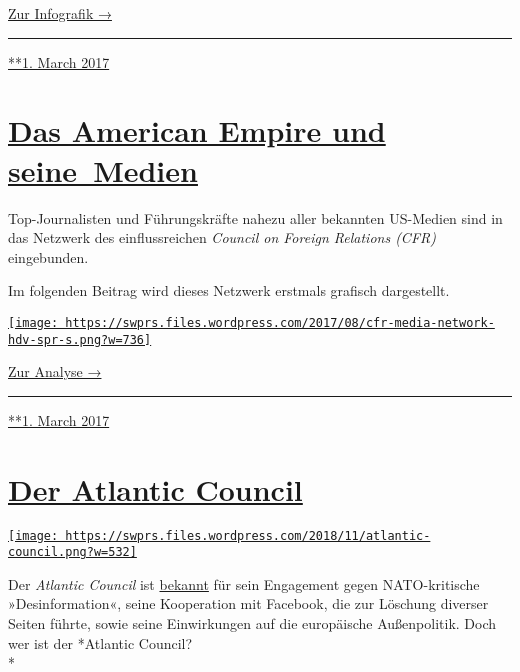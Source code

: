 \href{https://swprs.org/netzwerk-medien-schweiz}{Zur Infografik →}

\begin{center}\rule{0.5\linewidth}{\linethickness}\end{center}

\href{https://swprs.org/2017/03/01/das-netzwerk/}{**1. March 2017}

\hypertarget{das-american-empire-und-seine-medien}{%
\section{\texorpdfstring{\href{https://swprs.org/2017/03/01/netzwerk-medien-usa/}{Das
American Empire und
seine~Medien}}{Das American Empire und seine~Medien}}\label{das-american-empire-und-seine-medien}}

Top-Journalisten und Führungskräfte nahezu aller bekannten US-Medien
sind in das Netz­werk des einflussreichen \emph{Council on Foreign
Relations (CFR)} eingebunden.

Im folgenden Beitrag wird dieses Netzwerk erstmals grafisch
dar­ge­stellt.

\href{https://swprs.org/das-american-empire-und-seine-medien/}{\texttt{[image: https://swprs.files.wordpress.com/2017/08/cfr-media-network-hdv-spr-s.png?w=736]}}

\href{https://swprs.org/das-american-empire-und-seine-medien/}{Zur
Analyse →}

\begin{center}\rule{0.5\linewidth}{\linethickness}\end{center}

\href{https://swprs.org/2017/03/01/netzwerk-medien-usa/}{**1. March
2017}

\hypertarget{der-atlantic-council}{%
\section{\texorpdfstring{\href{https://swprs.org/2017/03/01/der-atlantic-council/}{Der
Atlantic Council}}{Der Atlantic Council}}\label{der-atlantic-council}}

\href{https://swprs.org/2017/03/01/der-atlantic-council/}{\texttt{[image: https://swprs.files.wordpress.com/2018/11/atlantic-council.png?w=532]}}

Der \emph{Atlantic Council} ist
\href{https://www.rubikon.news/artikel/facebook-als-waffe}{bekannt} für
sein En­ga­ge­ment gegen NATO-kritische »Des­in­for­ma­tion«, seine
Kooperation mit Facebook, die zur Lö­schung diverser Seiten führte,
sowie seine Ein­wir­kungen auf die eu­ro­pä­ische Außen­politik. Doch
wer ist der *Atlantic Council?\\
*

